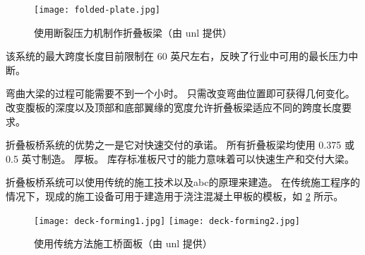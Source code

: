 \begin{figure}
  \texttt{[image: folded-plate.jpg]}
  \caption{使用断裂压力机制作折叠板梁（由 \acrshort{unl} 提供）}
  \label{fig:making-of-folded-plate-girder-using-break-press}
\end{figure}

该系统的最大跨度长度目前限制在 60 英尺左右，反映了行业中可用的最长压力中断。

弯曲大梁的过程可能需要不到一个小时。 只需改变弯曲位置即可获得几何变化。 改变腹板的深度以及顶部和底部翼缘的宽度允许折叠板梁适应不同的跨度长度要求。

折叠板桥系统的优势之一是它对快速交付的承诺。 所有折叠板梁均使用 0.375 或 0.5 英寸制造。 厚板。 库存标准板尺寸的能力意味着可以快速生产和交付大梁。

折叠板桥系统可以使用传统的施工技术以及\acrlong{abc}的原理来建造。 在传统施工程序的情况下，现成的施工设备可用于建造用于浇注混凝土甲板的模板，如 \cref{fig:deck-forming-conventional} 所示。

\begin{figure}
    \texttt{[image: deck-forming1.jpg]}\hfill
    \texttt{[image: deck-forming2.jpg]}
  \caption{使用传统方法施工桥面板（由 \acrshort{unl} 提供）}
  \label{fig:deck-forming-conventional}
\end{figure}

